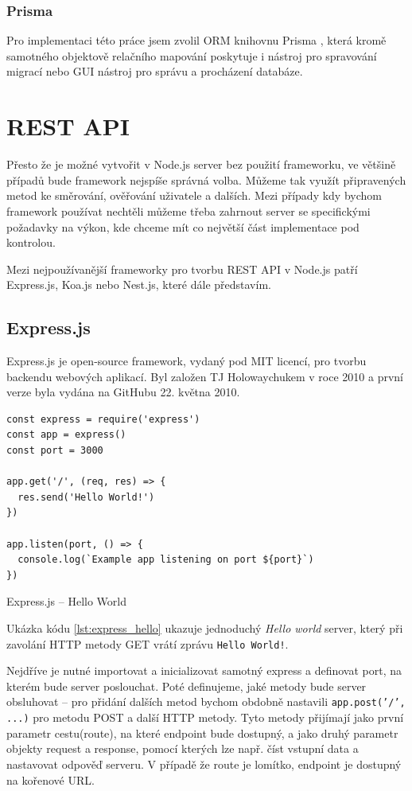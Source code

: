 \documentclass[thesis=M,czech]{FITthesis}[2019/12/23]
\begin{document}
\subsubsection*{Prisma}
Pro implementaci této práce jsem zvolil ORM knihovnu Prisma \cite{prisma}, která kromě samotného objektově relačního mapování poskytuje i nástroj pro spravování migrací nebo GUI nástroj pro správu a procházení databáze.

\section{REST API} %
Přesto že je možné vytvořit v Node.js server bez použití frameworku, ve většině případů bude framework nejspíše správná volba. %
 Můžeme tak využít připravených metod ke směrování, ověřování uživatele a dalších. Mezi případy kdy bychom framework používat nechtěli můžeme třeba zahrnout server se specifickými požadavky na výkon, kde chceme mít co největší část implementace pod kontrolou.

Mezi nejpoužívanější frameworky pro tvorbu REST API v Node.js patří Express.js, Koa.js nebo Nest.js, které dále představím. %
\subsection*{Express.js}
Express.js je open-source framework, vydaný pod MIT licencí, pro tvorbu backendu webových aplikací. Byl založen TJ Holowaychukem v roce 2010 a první verze byla vydána na GitHubu 22. května 2010. %

\begin{listing}[H]
\begin{verbatim}
const express = require('express')
const app = express()
const port = 3000

app.get('/', (req, res) => {
  res.send('Hello World!')
})

app.listen(port, () => {
  console.log(`Example app listening on port ${port}`)
})
\end{verbatim}
\caption{Express.js -- Hello World}
\label{lst:express_hello}
\end{listing}

Ukázka kódu \ref{lst:express_hello} ukazuje jednoduchý \textit{Hello world} server, který při zavolání HTTP metody GET vrátí zprávu \texttt{Hello World!}. 

Nejdříve je nutné importovat a inicializovat samotný express a definovat port, na kterém bude server poslouchat. Poté definujeme, jaké metody bude server obsluhovat -- pro přidání dalších metod bychom obdobně nastavili \texttt{app.post('/', ...)} pro metodu POST a další HTTP metody. Tyto metody přijímají jako první parametr cestu(route), na které endpoint bude dostupný, a jako druhý parametr objekty request a response, pomocí kterých lze např. číst vstupní data a nastavovat odpověď serveru. V případě že route je lomítko, endpoint je dostupný na kořenové URL.
\end{document}
